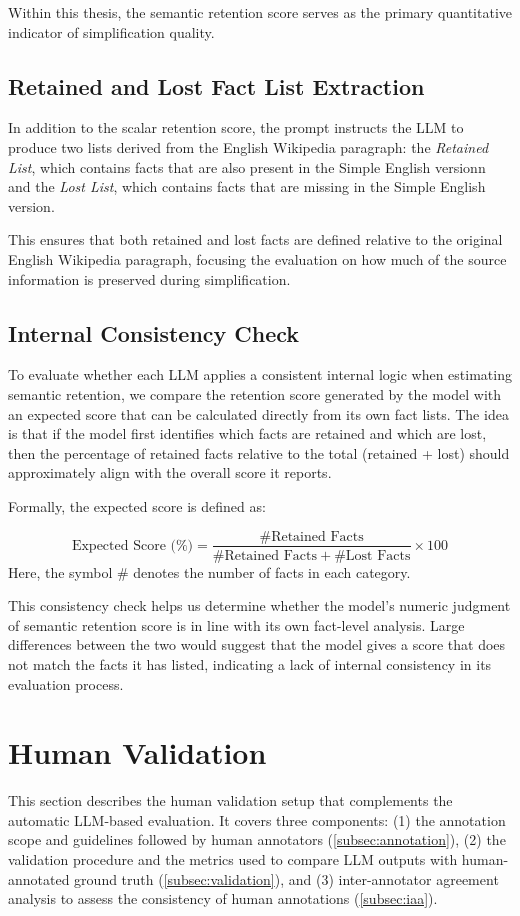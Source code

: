 \documentclass{DESSThesis}
\begin{document}
Within this thesis, the semantic retention score serves as the primary quantitative indicator of simplification quality.  

\subsection{Retained and Lost Fact List Extraction}
\label{subsec:factlists}
In addition to the scalar retention score, the prompt instructs the LLM to produce two lists derived from the English Wikipedia paragraph: 
the \textit{Retained List}, which contains facts that are also present in the Simple English versionn and 
the \textit{Lost List}, which contains facts that are missing in the Simple English version. 

This ensures that both retained and lost facts are defined relative to the original English Wikipedia paragraph, focusing the evaluation on how much of the source information is preserved during simplification.  

\subsection{Internal Consistency Check}
\label{subsec:consistency}
To evaluate whether each LLM applies a consistent internal logic when estimating semantic retention, we compare the retention score generated by the model with an expected score that can be calculated directly from its own fact lists. The idea is that if the model first identifies which facts are retained and which are lost, then the percentage of retained facts relative to the total (retained + lost) should approximately align with the overall score it reports.  

Formally, the expected score is defined as:  

\[
\text{Expected Score (\%)} = \frac{\# \text{Retained Facts}}{\# \text{Retained Facts} + \# \text{Lost Facts}} \times 100
\]
Here, the symbol $\#$ denotes the number of facts in each category.

This consistency check helps us determine whether the model’s numeric judgment of semantic retention score is in line with its own fact-level analysis. Large differences between the two would suggest that the model gives a score that does not match the facts it has listed, indicating a lack of internal consistency in its evaluation process.

\section{Human Validation}
\label{sec:human_validation}
This section describes the human validation setup that complements the automatic LLM-based evaluation. It covers three components: 
(1) the annotation scope and guidelines followed by human annotators (\autoref{subsec:annotation}), 
(2) the validation procedure and the metrics used to compare LLM outputs with human-annotated ground truth (\autoref{subsec:validation}), and 
(3) inter-annotator agreement analysis to assess the consistency of human annotations (\autoref{subsec:iaa}).  
\end{document}
